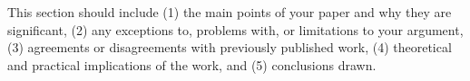 

This section should include (1) the main points of your paper and why they are significant, (2) any exceptions to, problems with, or limitations to your argument, (3) agreements or disagreements with previously published work, (4) theoretical and practical implications of the work, and (5) conclusions drawn.

\EndExtendedAbstract
